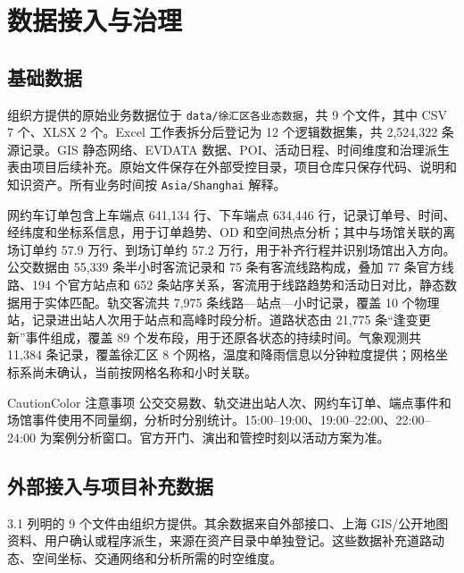 \documentclass[a4paper,11pt]{article}
\newenvironment{caution} {\begin{admonition}{CautionColor} {注意事项}}{\end{admonition}}
\newcommand{\code}[1]{\texttt{#1}}
\begin{document}
\newpage
\section{数据接入与治理}

\subsection{基础数据}

组织方提供的原始业务数据位于 \code{data/徐汇区各业态数据}，共 9 个文件，其中 CSV 7 个、XLSX 2 个。Excel 工作表拆分后登记为 12 个逻辑数据集，共 2,524,322 条源记录。GIS 静态网络、EVDATA 数据、POI、活动日程、时间维度和治理派生表由项目后续补充。原始文件保存在外部受控目录，项目仓库只保存代码、说明和知识资产。所有业务时间按 \code{Asia/Shanghai} 解释。

网约车订单包含上车端点 641,134 行、下车端点 634,446 行，记录订单号、时间、经纬度和坐标系信息，用于订单趋势、OD 和空间热点分析；其中与场馆关联的离场订单约 57.9 万行、到场订单约 57.2 万行，用于补齐行程并识别场馆出入方向。公交数据由 55,339 条半小时客流记录和 75 条有客流线路构成，叠加 77 条官方线路、194 个官方站点和 652 条站序关系，客流用于线路趋势和活动日对比，静态数据用于实体匹配。轨交客流共 7,975 条线路—站点—小时记录，覆盖 10 个物理站，记录进出站人次用于站点和高峰时段分析。道路状态由 21,775 条``逢变更新''事件组成，覆盖 89 个发布段，用于还原各状态的持续时间。气象观测共 11,384 条记录，覆盖徐汇区 8 个网格，温度和降雨信息以分钟粒度提供；网格坐标系尚未确认，当前按网格名称和小时关联。

\begin{caution}
公交交易数、轨交进出站人次、网约车订单、端点事件和场馆事件使用不同量纲，分析时分别统计。15:00--19:00、19:00--22:00、22:00--24:00 为案例分析窗口。官方开门、演出和管控时刻以活动方案为准。
\end{caution}

\subsection{外部接入与项目补充数据}

3.1 列明的 9 个文件由组织方提供。其余数据来自外部接口、上海 GIS/公开地图资料、用户确认或程序派生，来源在资产目录中单独登记。这些数据补充道路动态、空间坐标、交通网络和分析所需的时空维度。
\end{document}

